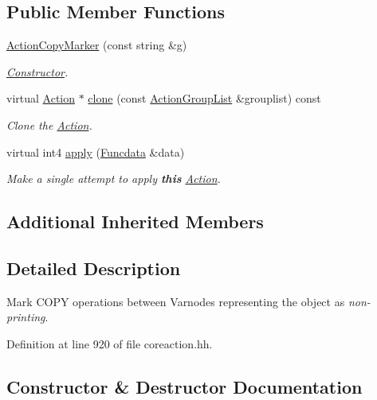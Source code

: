 \subsection*{Public Member Functions}
\begin{DoxyCompactItemize}
\item 
\mbox{\hyperlink{class_action_copy_marker_ad9915844d441460dbd8ccad469b20cb6}{Action\+Copy\+Marker}} (const string \&g)
\begin{DoxyCompactList}\small\item\em \mbox{\hyperlink{class_constructor}{Constructor}}. \end{DoxyCompactList}\item 
virtual \mbox{\hyperlink{class_action}{Action}} $\ast$ \mbox{\hyperlink{class_action_copy_marker_adb38f76f4afa65f97dbc971c2096437f}{clone}} (const \mbox{\hyperlink{class_action_group_list}{Action\+Group\+List}} \&grouplist) const
\begin{DoxyCompactList}\small\item\em Clone the \mbox{\hyperlink{class_action}{Action}}. \end{DoxyCompactList}\item 
virtual int4 \mbox{\hyperlink{class_action_copy_marker_a95c1faed40c03761a5fac5c87af6a272}{apply}} (\mbox{\hyperlink{class_funcdata}{Funcdata}} \&data)
\begin{DoxyCompactList}\small\item\em Make a single attempt to apply {\bfseries{this}} \mbox{\hyperlink{class_action}{Action}}. \end{DoxyCompactList}\end{DoxyCompactItemize}
\subsection*{Additional Inherited Members}


\subsection{Detailed Description}
Mark C\+O\+PY operations between Varnodes representing the object as {\itshape non-\/printing}. 

Definition at line 920 of file coreaction.\+hh.



\subsection{Constructor \& Destructor Documentation}
\mbox{\label{class_action_copy_marker_ad9915844d441460dbd8ccad469b20cb6}} 
